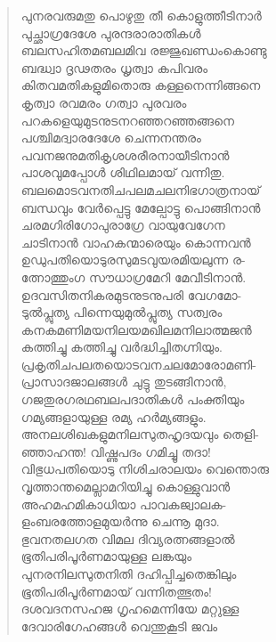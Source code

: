 \begin{verse}
പുനരവരുമതു പൊഴുതു തീ കൊളുത്തീടിനാര്‍\\
പുച്ഛാഗ്രദേശേ പുരന്ദരാരാതികള്‍\\
ബലസഹിതമബലമിവ രജ്ജുഖണ്ഡംകൊണ്ടു\\
ബദ്ധ്വാ ദൃഢതരം ധൃത്വാ കപിവരം\\
കിതവമതികളുമിതൊരു കള്ളനെന്നിങ്ങനെ\\
കൃത്വാ രവമരം ഗത്വാ പുരവരം\\
പറകളെയുമുടനുടനറഞ്ഞറഞ്ഞങ്ങനെ\\
പശ്ചിമദ്വാരദേശേ ചെന്നനന്തരം\\
പവനജനുമതികൃശശരീരനായീടിനാന്‍\\
പാശവുമപ്പോള്‍ ശിഥിലമായ് വന്നിതു.\\
ബലമൊടവനതിചപലമചലനിഭഗാത്രനായ്\\
ബന്ധവും വേര്‍പ്പെട്ടു മേല്പോട്ടു പൊങ്ങിനാന്‍\\
ചരമഗിരിഗോപുരാഗ്രേ വായുവേഗേന\\
ചാടിനാന്‍ വാഹകന്മാരെയും കൊന്നവന്‍\\
ഉഡുപതിയൊടുരസുമടവുയരമിയലുന്ന ര-\\
ത്നോത്തുംഗ സൗധാഗ്രമേറി മേവീടിനാന്‍.\\
ഉദവസിതനികരമുടനുടനുപരി വേഗമോ-\\
ടുല്‍പ്ലുത്യ പിന്നെയുമുല്‍പ്ലുത്യ സത്വരം\\
കനകമണിമയനിലയമഖിലമനിലാത്മജന്‍\\
കത്തിച്ചു കത്തിച്ചു വര്‍ദ്ധിച്ചിതഗ്നിയും.\\
പ്രകൃതിചപലതയൊടവനചലമോരോമണി-\\
പ്രാസാദജാലങ്ങള്‍ ചുട്ടു തുടങ്ങിനാന്‍,\\
ഗജതുരഗരഥബലപദാതികള്‍ പംക്തിയും\\
ഗമ്യങ്ങളായുള്ള രമ്യ ഹര്‍മ്യങ്ങളും.\\
അനലശിഖകളുമനിലസുതഹൃദയവും തെളി-\\
ഞ്ഞാഹന്ത! വിഷ്ണുപദം ഗമിച്ചൂ തദാ!\\
വിഭുധപതിയൊടു നിശിചരാലയം വെന്തൊരു\\
വൃത്താന്തമെല്ലാമറിയിച്ചു കൊള്ളുവാന്‍\\
അഹമഹമികാധിയാ പാവകജ്വാലക-\\
ളംബരത്തോളമുയര്‍ന്നു ചെന്നൂ മുദാ.\\
ഭുവനതലഗത വിമല ദിവ്യരത്നങ്ങളാല്‍\\
ഭൂതിപരിപൂര്‍ണമായുള്ള ലങ്കയും\\
പുനരനിലസുതനിതി ദഹിപ്പിച്ചതെങ്കിലും\\
ഭൂതിപരിപൂര്‍ണമായ് വന്നിതത്ഭുതം!\\
ദശവദനസഹജ ഗൃഹമെന്നിയേ മറ്റുള്ള\\
ദേവാരിഗേഹങ്ങള്‍ വെന്തുകൂടി ജവം\\

\end{verse}
